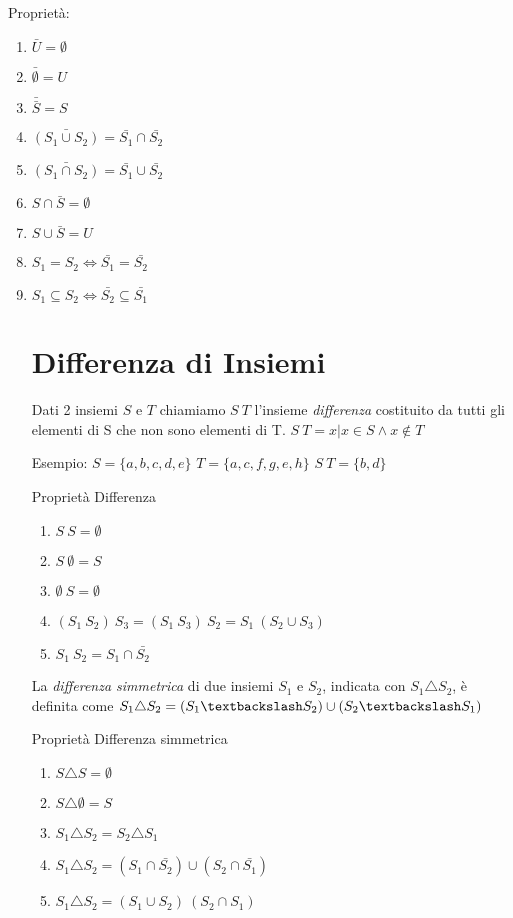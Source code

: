 Proprietà:
\begin{enumerate}
  \item $\bar{U} = \emptyset $
  \item $\bar{\emptyset} = U$
  \item $\bar{\bar{S}} = S$
  \item $\bar{(S_1 \cup S_2)} = \bar{S_1} \cap \bar{S_2}$
  \item $\bar{(S_1 \cap S_2)} = \bar{S_1} \cup \bar{S_2}$
  \item $S \cap \bar{S} = \emptyset$
  \item $S \cup \bar{S} = U$
  \item $S_1 = S_2 \iff \bar{S_1} = \bar{S_2}$
  \item $S_1 \subseteq S_2 \iff \bar{S_2} \subseteq \bar{S_1}$

\section{Differenza di Insiemi}
Dati 2 insiemi $S$ e $T$ chiamiamo $S \ T$ l'insieme \textit{differenza} costituito
da tutti gli elementi di S che non sono elementi di T. \newline
$S \ T = {x | x \in S \land x \not \in T} $

Esempio: \newline
$S = \{a,b,c,d,e\}$ \quad $T = \{a,c,f,g,e,h\}$\newline
$S \ T = \{b,d\}$

Proprietà Differenza
\begin{enumerate}
  \item $S \ S = \emptyset$
  \item $S \ \emptyset = S$
  \item $\emptyset \ S = \emptyset$
  \item $(S_1 \ S_2) \ S_3 = (S_1 \ S_3) \ S_2 = S_1 \ (S_2 \cup S_3)$
  \item $S_1 \ S_2 = S_1 \cap \bar{S_2}$
\end{enumerate}

La \textit{differenza simmetrica} di due insiemi $S_1$ e $S_2$, indicata con $S_1 \triangle S_2$,
è definita come $S_1 \triangle S_2 = (S_1 \textbackslash S_2) \cup (S_2 \textbackslash S_1) $

Proprietà Differenza simmetrica
\begin{enumerate}
  \item $S \triangle S = \emptyset$
  \item $S \triangle \emptyset = S$
  \item $S_1 \triangle S_2 = S_2 \triangle S_1$
  \item $S_1 \triangle S_2 = (S_1 \cap \bar{S_2}) \cup (S_2 \cap \bar{S_1})$
  \item $S_1 \triangle S_2 = (S_1 \cup S_2) \ (S_2 \cap S_1)$
\end{enumerate}


\end{enumerate}
